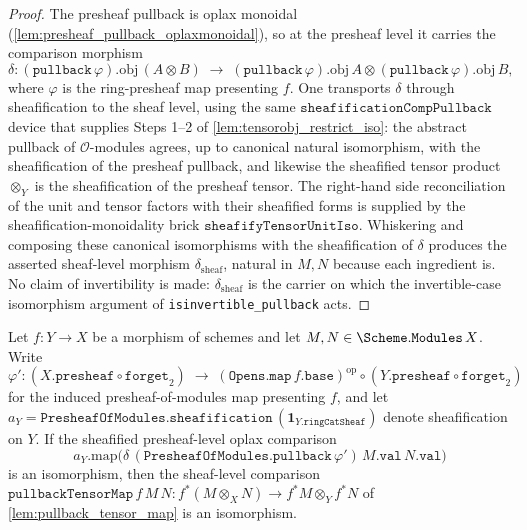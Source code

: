 \begin{proof}
  \leanok
  The presheaf pullback is oplax monoidal (\cref{lem:presheaf_pullback_oplaxmonoidal}),
  so at the presheaf level it carries the comparison morphism
  \[
    \delta : (\mathtt{pullback}\,\varphi).\mathrm{obj}\,(A \otimes B)
      \;\longrightarrow\;
      (\mathtt{pullback}\,\varphi).\mathrm{obj}\,A
        \otimes (\mathtt{pullback}\,\varphi).\mathrm{obj}\,B,
  \]
  where \(\varphi\) is the ring-presheaf map presenting \(f\). One transports \(\delta\)
  through sheafification to the sheaf level, using the same
  \(\mathtt{sheafificationCompPullback}\) device that supplies Steps 1--2 of
  \cref{lem:tensorobj_restrict_iso}: the abstract pullback of \(\mathcal{O}\)-modules
  agrees, up to canonical natural isomorphism, with the sheafification of the presheaf
  pullback, and likewise the sheafified tensor product \(\otimes_Y\) is the
  sheafification of the presheaf tensor. The right-hand side reconciliation of the unit
  and tensor factors with their sheafified forms is supplied by the
  sheafification-monoidality brick \(\mathtt{sheafifyTensorUnitIso}\). Whiskering and
  composing these canonical isomorphisms with the sheafification of \(\delta\) produces
  the asserted sheaf-level morphism \(\delta_{\mathrm{sheaf}}\), natural in \(M, N\)
  because each ingredient is. No claim of invertibility is made: \(\delta_{\mathrm{sheaf}}\)
  is the carrier on which the invertible-case isomorphism argument of
  \texttt{isinvertible\_pullback} acts.
\end{proof}

\begin{lemma}


  \label{lem:isiso_pullbacktensormap_of_sheafifydelta}
  Let \(f : Y \to X\) be a morphism of schemes and let
  \(M, N \in \Scheme.\mathtt{Modules}\,X\). Write
  \[
    \varphi' :
      (X.\mathtt{presheaf} \circ \mathtt{forget}_2)
      \;\longrightarrow\;
      (\mathtt{Opens.map}\,f.\mathtt{base})^{\mathrm{op}}
        \circ (Y.\mathtt{presheaf} \circ \mathtt{forget}_2)
  \]
  for the induced presheaf-of-modules map presenting \(f\), and let
  \(a_Y = \mathtt{PresheafOfModules.sheafification}\,(\mathbf{1}_{Y.\mathtt{ringCatSheaf}})\)
  denote sheafification on \(Y\). If the sheafified presheaf-level oplax comparison
  \[
    a_Y.\mathrm{map}\bigl(
      \delta\,(\mathtt{PresheafOfModules.pullback}\,\varphi')\,M.\mathtt{val}\,N.\mathtt{val}
    \bigr)
  \]
  is an isomorphism, then the sheaf-level comparison
  \(\mathtt{pullbackTensorMap}\,f\,M\,N : f^*(M \otimes_X N) \to f^*M \otimes_Y f^*N\)
  of \cref{lem:pullback_tensor_map} is an isomorphism.
\end{lemma}

